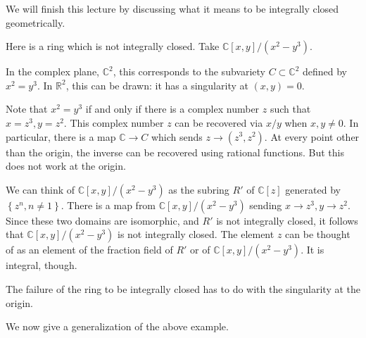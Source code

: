 We will finish this lecture by discussing what it means to be integrally closed
geometrically.

\begin{example} 
Here is a ring which is not integrally closed. Take  $\mathbb{C}[x, y]/(x^2 - y^3)$.

In the complex plane, $\mathbb{C}^2$, this corresponds to the subvariety $C
\subset \mathbb{C}^2$ defined by $x^2 =
y^3$.  In $\mathbb{R}^2$, this can be drawn: it has a singularity at $(x,y)=0$.  

Note that $x^2 = y^3$ if and only if there is a complex number $z$ such that $x
= z^3, y = z^2$. This complex number $z$ can be recovered via $x/y$ when $x,y
\neq 0$. In particular, there is a map $\mathbb{C} \to C$ which sends $z \to
(z^3, z^2)$.  At every point other than the origin, the inverse can be
recovered using rational functions. But this does not work at the origin. 

We can think of $\mathbb{C}[x,y]/(x^2 - y^3)$ as the subring $R'$ of $\mathbb{C}[z]$
generated by $\left\{z^n, n \neq 1\right\}$.  There is a map from
$\mathbb{C}[x,y]/(x^2 - y^3)$ sending $x \to z^3, y \to z^2$.  Since these two
domains are isomorphic, and $R'$ is not integrally closed, it follows that
$\mathbb{C}[x,y]/(x^2 - y^3)$ is not integrally closed.
The element $z$ can be thought of as an element of the fraction field of $R'$
or of $\mathbb{C}[x,y]/(x^2 - y^3)$.  
It is integral, though. 

The failure of the ring to be integrally closed has to do with the singularity at the
origin.  
\end{example} 


We now give a generalization of the above example.

